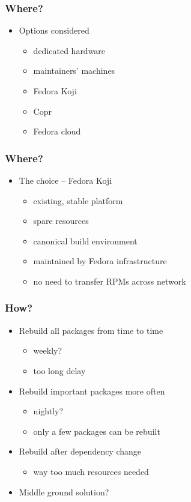 \documentclass[pdftex,unicode,xcolor=table]{beamer}
\begin{document}
\begin{frame}
  \frametitle{Where?}
  \begin{itemize}
  \item Options considered
    \begin{itemize}
      \item dedicated hardware
      \item maintainers' machines
      \item Fedora Koji
      \item Copr
      \item Fedora cloud
    \end{itemize}
  \end{itemize}
\end{frame}

\begin{frame}
  \frametitle{Where?}
  \begin{itemize}
  \item The choice -- Fedora Koji
    \begin{itemize}
      \item existing, stable platform
      \item spare resources
      \item canonical build environment
      \item maintained by Fedora infrastructure
      \item no need to transfer RPMs across network
    \end{itemize}
  \end{itemize}
\end{frame}

\begin{frame}
  \frametitle{How?}
  \begin{itemize}
  \item Rebuild all packages from time to time
    \begin{itemize}
      \item weekly?
      \item too long delay
    \end{itemize}
  \item Rebuild important packages more often
    \begin{itemize}
      \item nightly?
      \item only a few packages can be rebuilt
    \end{itemize}
  \item Rebuild after dependency change
    \begin{itemize}
      \item way too much resources needed
    \end{itemize}
  \item Middle ground solution?
  \end{itemize}
\end{frame}
\end{document}
